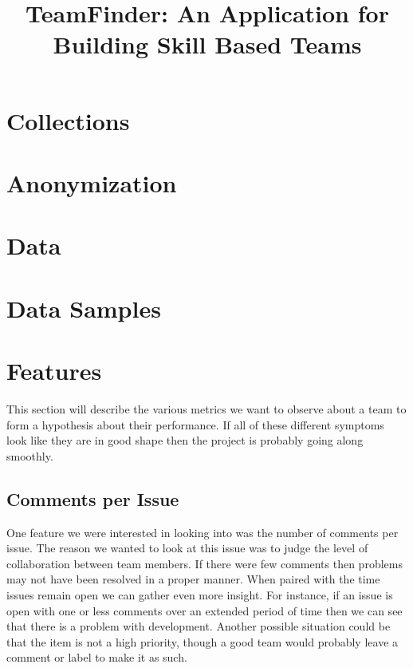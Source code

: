 \documentclass[conference]{IEEEtran}
\begin{document}
\title{TeamFinder: An Application for Building Skill Based Teams}


\author{
}


\maketitle

\section{Collections}


\section{Anonymization}

\section{Data}

\section{Data Samples}

\section{Features}
This section will describe the various metrics we want to observe about a team to form a hypothesis about their performance. If all of these different symptoms look like they are in good shape then the project is probably going along smoothly. 

\subsection{Comments per Issue}
One feature we were interested in looking into was the number of comments per issue. The reason we wanted to look at this issue was to judge the level of collaboration between team members. If there were few comments then problems may not have been resolved in a proper manner. When paired with the time issues remain open we can gather even more insight. For instance, if an issue is open with one or less comments over an extended period of time then we can see that there is a problem with development. Another possible situation could be that the item is not a high priority, though a good team would probably leave a comment or label to make it as such. 
\end{document}
